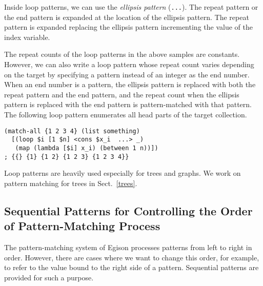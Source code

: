 \documentclass{article}
\begin{document}
Inside loop patterns, we can use the \emph{ellipsis pattern} (\texttt{...}).
The repeat pattern or the end pattern is expanded at the location of the ellipsis pattern.
The repeat pattern is expanded replacing the ellipsis pattern incrementing the value of the index variable.


\medskip

The repeat counts of the loop patterns in the above samples are constants.
However, we can also write a loop pattern whose repeat count varies depending on the target by specifying a pattern instead of an integer as the end number.
When an end number is a pattern, the ellipsis pattern is replaced with both the repeat pattern and the end pattern, and the repeat count when the ellipsis pattern is replaced with the end pattern is pattern-matched with that pattern.
The following loop pattern enumerates all head parts of the target collection.

{\footnotesize
\begin{lstlisting}[language=egison]
(match-all {1 2 3 4} (list something)
  [(loop $i [1 $n] <cons $x_i  ...> _)
   (map (lambda [$i] x_i) (between 1 n))])
; {{} {1} {1 2} {1 2 3} {1 2 3 4}}
\end{lstlisting}
}

Loop patterns are heavily used especially for trees and graphs.
We work on pattern matching for trees in Sect.~\ref{trees}.

\subsection{Sequential Patterns for Controlling the Order of Pattern-Matching Process}\label{seq-patterns}

The pattern-matching system of Egison processes patterns from left to right in order.
However, there are cases where we want to change this order, for example, to refer to the value bound to the right side of a pattern.
Sequential patterns are provided for such a purpose.
\end{document}
